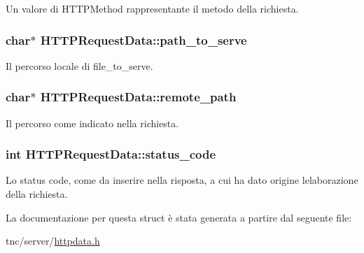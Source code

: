 Un valore di H\+T\+T\+P\+Method rappresentante il metodo della richiesta. 

\hypertarget{structHTTPRequestData_a71bcae8a8f14feb676826a6b8a76604e}{}
\subsubsection[{path\+\_\+to\+\_\+serve}]{\setlength{\rightskip}{0pt plus 5cm}char$\ast$ H\+T\+T\+P\+Request\+Data\+::path\+\_\+to\+\_\+serve}\label{structHTTPRequestData_a71bcae8a8f14feb676826a6b8a76604e}


Il percorso locale di file\+\_\+to\+\_\+serve. 

\hypertarget{structHTTPRequestData_a04c7c946a943f429f2529cf220076c26}{}
\subsubsection[{remote\+\_\+path}]{\setlength{\rightskip}{0pt plus 5cm}char$\ast$ H\+T\+T\+P\+Request\+Data\+::remote\+\_\+path}\label{structHTTPRequestData_a04c7c946a943f429f2529cf220076c26}


Il percorso come indicato nella richiesta. 

\hypertarget{structHTTPRequestData_a47c202aa745d8a5eb2a5dc7cbc3087aa}{}
\subsubsection[{status\+\_\+code}]{\setlength{\rightskip}{0pt plus 5cm}int H\+T\+T\+P\+Request\+Data\+::status\+\_\+code}\label{structHTTPRequestData_a47c202aa745d8a5eb2a5dc7cbc3087aa}


Lo status code, come da inserire nella risposta, a cui ha dato origine l\textquotesingle{}elaborazione della richiesta. 



La documentazione per questa struct è stata generata a partire dal seguente file\+:\begin{DoxyCompactItemize}
\item 
tnc/server/\hyperlink{httpdata_8h}{httpdata.\+h}\end{DoxyCompactItemize}
